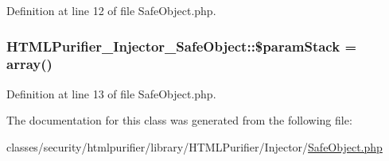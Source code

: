 Definition at line 12 of file Safe\+Object.\+php.

\hypertarget{classHTMLPurifier__Injector__SafeObject_a9d8f249ce6106264ed87538810c7bd2f}{
\subsubsection[{\$param\+Stack}]{\setlength{\rightskip}{0pt plus 5cm}H\+T\+M\+L\+Purifier\+\_\+\+Injector\+\_\+\+Safe\+Object\+::\$param\+Stack = array()\hspace{0.3cm}{\ttfamily [protected]}}}\label{classHTMLPurifier__Injector__SafeObject_a9d8f249ce6106264ed87538810c7bd2f}


Definition at line 13 of file Safe\+Object.\+php.



The documentation for this class was generated from the following file\+:\begin{DoxyCompactItemize}
\item 
classes/security/htmlpurifier/library/\+H\+T\+M\+L\+Purifier/\+Injector/\hyperlink{Injector_2SafeObject_8php}{Safe\+Object.\+php}\end{DoxyCompactItemize}
